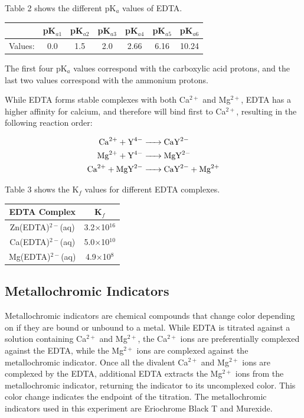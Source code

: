 \documentclass{article}
\begin{document}
Table 2 shows the different pK$_a$ values of EDTA. \cite{chemwiki}
\begin{center}
        \begin{tabular}{|c|c|c|c|c|c|c|}
                \hline
                & pK$_{a1}$ & pK$_{a2}$ & pK$_{a3}$ & pK$_{a4}$ & pK$_{a5}$ &
                pK$_{a6}$ \\
                \hline
                Values: & 0.0 & 1.5 & 2.0 & 2.66 & 6.16 & 10.24 \\
                \hline
        \end{tabular}
\end{center}
The first four pK$_a$ values correspond with the carboxylic acid protons, and
the last two values correspond with the ammonium protons.

While EDTA forms stable complexes with both Ca$^{2+}$ and Mg$^{2+}$, EDTA has a higher affinity for
calcium, and therefore will bind first to Ca$^{2+}$, resulting in the following reaction order:

\begin{center}
        \begin{align}
                \ce {Ca^2+ + Y^4- &-> CaY^2-}\\
                \ce {Mg^2+ + Y^4- &-> MgY^2-}\\
                \ce {Ca^2+ + MgY^2- &-> CaY^2- + Mg^2+}
        \end{align}
\end{center}

Table 3 shows the K$_f$ values for different EDTA complexes.
\begin{center}
\begin{tabular}{|c|c|}
        \hline
        EDTA Complex & K$_f$ \\
        \hline
        Zn(EDTA)$^{2-}$(aq) & 3.2$\times$10$^{16}$ \\
        Ca(EDTA)$^{2-}$(aq) & 5.0$\times$10$^{10}$ \\
        Mg(EDTA)$^{2-}$(aq) & 4.9$\times$10$^{8}$ \\
        \hline
\end{tabular}
\end{center}


\subsection {Metallochromic Indicators}
Metallochromic indicators are chemical compounds that change color depending on if they are
bound or unbound to a metal.
While EDTA is titrated against a solution containing Ca$^{2+}$ and Mg$^{2+}$, the Ca$^{2+}$ ions are
preferentially complexed against the EDTA, while the Mg$^{2+}$ ions are complexed against the
metallochromic indicator. \cite{lab_man}
Once all the divalent Ca$^{2+}$ and Mg$^{2+}$ ions are complexed by the EDTA, additional EDTA extracts
the Mg$^{2+}$ ions from the metallochromic indicator, returning the indicator to its uncomplexed
color. This color change indicates the endpoint of the titration.
The metallochromic indicators used in this experiment are Eriochrome Black T and
Murexide.
\end{document}
